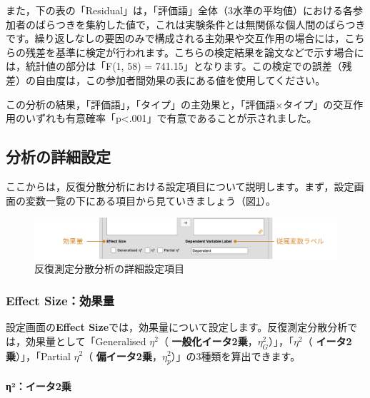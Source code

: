 \documentclass[
  12pt,
  a5jpaper,
  lualatex, ja=standard]{bxjsbook}
\renewcommand{\emph}[1]{\textbf{\color{emph} #1}}
\begin{document}
また，下の表の「Residual」は，「評価語」全体（3水準の平均値）における各参加者のばらつきを集約した値で，これは実験条件とは無関係な個人間のばらつきです。繰り返しなしの要因のみで構成される主効果や交互作用の場合には，こちらの残差を基準に検定が行われます。こちらの検定結果を論文などで示す場合には，統計値の部分は「F(1, 58) = 741.15」となります。この検定での誤差（残差）の自由度は，この参加者間効果の表にある値を使用してください。

この分析の結果，「評価語」，「タイプ」の主効果と，「評価語×タイプ」の交互作用のいずれも有意確率「p\textless.001」で有意であることが示されました。

\hypertarget{sub:ANOVA-rm-details}{%
\subsection{分析の詳細設定}\label{sub:ANOVA-rm-details}}

ここからは，反復分散分析における設定項目について説明します。まず，設定画面の変数一覧の下にある項目から見ていきましょう（図\ref{fig:ANOVA-rm-effect-size}）。

\begin{figure}[!ht]

{\centering \includegraphics[width=1\linewidth]{images/ANOVA/rm-effect-size} 

}

\caption{反復測定分散分析の詳細設定項目}\label{fig:ANOVA-rm-effect-size}
\end{figure}

\hypertarget{effect-sizeux52b9ux679cux91cf-3}{%
\subsubsection*{Effect Size：効果量}\label{effect-sizeux52b9ux679cux91cf-3}}

設定画面の\textbf{Effect Size}では，効果量について設定します。反復測定分散分析では，効果量として「Generalised \(\eta^2\)（\emph{一般化イータ2乗}，\(\eta^2_G\)）」，「\(\eta^2\)（\emph{イータ2乗}）」，「Partial \(\eta^2\)（\emph{偏イータ2乗}，\(\eta^2_p\)）」の3種類を算出できます。

\hypertarget{ux3b7uxb2ux30a4ux30fcux30bf2ux4e57}{%
\paragraph*{η²：イータ2乗}\label{ux3b7uxb2ux30a4ux30fcux30bf2ux4e57}}
\end{document}
